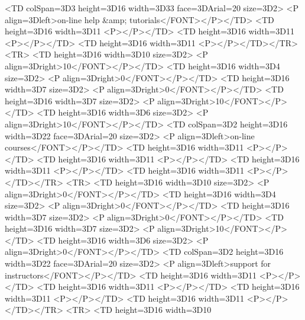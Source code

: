         <TD colSpan=3D3 height=3D16 width=3D33%
face=3DArial=20
            size=3D2>
            <P align=3Dleft>on-line help &amp; tutorials</FONT></P></TD>
        <TD height=3D16 width=3D11%
            <P></P></TD>
        <TD height=3D16 width=3D11%
            <P></P></TD>
        <TD height=3D16 width=3D11%
            <P></P></TD></TR>
    <TR>
        <TD height=3D16 width=3D10%
size=3D2>
            <P align=3Dright>10</FONT></P></TD>
        <TD height=3D16 width=3D4%
size=3D2>
            <P align=3Dright>0</FONT></P></TD>
        <TD height=3D16 width=3D7%
size=3D2>
            <P align=3Dright>0</FONT></P></TD>
        <TD height=3D16 width=3D7%
size=3D2>
            <P align=3Dright>10</FONT></P></TD>
        <TD height=3D16 width=3D6%
size=3D2>
            <P align=3Dright>10</FONT></P></TD>
        <TD colSpan=3D2 height=3D16 width=3D22%
face=3DArial=20
            size=3D2>
            <P align=3Dleft>on-line courses</FONT></P></TD>
        <TD height=3D16 width=3D11%
            <P></P></TD>
        <TD height=3D16 width=3D11%
            <P></P></TD>
        <TD height=3D16 width=3D11%
            <P></P></TD>
        <TD height=3D16 width=3D11%
            <P></P></TD></TR>
    <TR>
        <TD height=3D16 width=3D10%
size=3D2>
            <P align=3Dright>0</FONT></P></TD>
        <TD height=3D16 width=3D4%
size=3D2>
            <P align=3Dright>0</FONT></P></TD>
        <TD height=3D16 width=3D7%
size=3D2>
            <P align=3Dright>0</FONT></P></TD>
        <TD height=3D16 width=3D7%
size=3D2>
            <P align=3Dright>10</FONT></P></TD>
        <TD height=3D16 width=3D6%
size=3D2>
            <P align=3Dright>0</FONT></P></TD>
        <TD colSpan=3D2 height=3D16 width=3D22%
face=3DArial=20
            size=3D2>
            <P align=3Dleft>support for instructors</FONT></P></TD>
        <TD height=3D16 width=3D11%
            <P></P></TD>
        <TD height=3D16 width=3D11%
            <P></P></TD>
        <TD height=3D16 width=3D11%
            <P></P></TD>
        <TD height=3D16 width=3D11%
            <P></P></TD></TR>
    <TR>
        <TD height=3D16 width=3D10%
